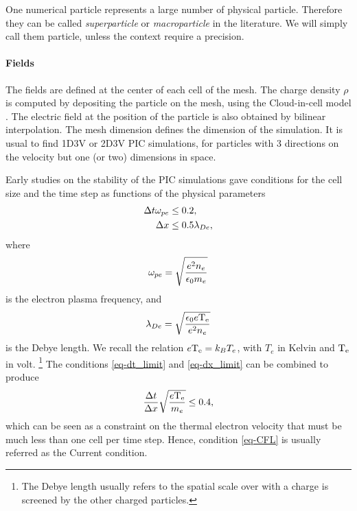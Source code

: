     One numerical particle represents a large number of physical particle. 
    Therefore they can be called \emph{superparticle} or \emph{macroparticle} in the literature.
    We will simply call them particle, unless the context require a precision.
    
    \paragraph{Fields\\}
    The fields are defined at the center of each cell of the mesh.
    The charge density $\rho$ is computed by depositing the particle on the mesh, using the Cloud-in-cell model \cite{birdsall1991}.
    The electric field at the position of the particle is also obtained by bilinear interpolation.
    The mesh dimension defines the dimension of the simulation.
    It is usual to find \acs{1D}\acs{3V} or \acs{2D}\acs{3V} \ac{PIC} simulations, for particles with 3 directions on the velocity but one (or two) dimensions in space.
    
    Early studies on the stability of the \ac{PIC} simulations gave conditions for the cell size and the time step as functions of the physical parameters \citep{birdsall1991,turner2013}
    \begin{align}
      \Delta t  \omega_{pe} &\leq 0.2,  \label{eq-dt_limit} \\
      \Delta x &\leq 0.5 \lambda_{De}, \label{eq-dx_limit}
    \end{align}
    where 
    \begin{equation} \label{eq-def_ope}
      \omega_{pe} =  \sqrt{\frac{e^2 n_e}{ \epsilon_0 m_e}}
    \end{equation}
    is the electron plasma frequency, and 
    \begin{equation} \label{eq-def_lde}
        \lambda_{De} = \sqrt{\frac{ \epsilon_0 e\mathrm{T_e}}{e^2 n_e}} 
    \end{equation}
    is the Debye length.
    We recall the relation $e \mathrm{T_e} = k_B T_e$, with $T_e$ in Kelvin and $\mathrm{T_e}$ in volt.
    \footnote{The Debye length usually refers to the spatial scale over with a charge is screened by the other charged particles. }
    The conditions \ref{eq-dt_limit} and \ref{eq-dx_limit} can be combined to produce 
    \begin{equation} \label{eq-CFL}
      \frac{\Delta t}{\Delta x}\sqrt{\frac{e \mathrm{T_e}}{m_e}} \leq 0.4,
    \end{equation}
    which can be seen as a constraint on the thermal electron velocity that must be much less than one cell per time step.
    Hence, condition \ref{eq-CFL} is usually referred as the Current condition.
    
